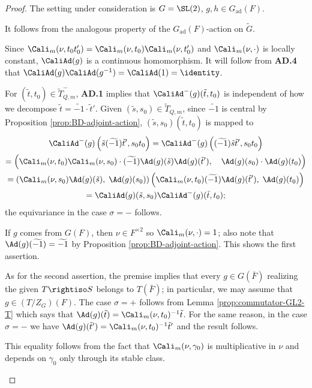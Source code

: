 \documentclass[a4paper,10pt]{article}
\begin{document}
\begin{proof}
	The setting under consideration is $G=\SL(2)$, $g,h \in G_\text{ad}(F)$.
	\begin{asparaenum}[\bfseries{AD}.1.\;]
	\item It follows from the analogous property of the $G_\text{ad}(F)$-action on $\tilde{G}$.
 
	\item Since $\Cali_m(\nu, t_0 t'_0) = \Cali_m(\nu, t_0) \Cali_m(\nu, t'_0)$ and $\Cali_m(\nu, \cdot)$ is locally constant, $\CaliAd(g)$ is a continuous homomorphism. It will follow from \textbf{AD.4} that $\CaliAd(g) \CaliAd(g^{-1}) = \CaliAd(1) = \identity$.
	
	For $(\tilde{t}, t_0) \in \tilde{T}^-_{Q,m}$, \textbf{AD.1} implies that $\CaliAd^-(g)(\tilde{t}, t_0)$ is independent of how we decompose $\tilde{t} = \widetilde{-1} \cdot \tilde{t}'$. Given $(\tilde{s}, s_0) \in \tilde{T}_{Q,m}$, since $\widetilde{-1}$ is central by Proposition \ref{prop:BD-adjoint-action}, $(\tilde{s}, s_0)(\tilde{t}, t_0)$ is mapped to
	\begin{multline*}
		\CaliAd^-(g)\left( \tilde{s} (\widetilde{-1}) \tilde{t}', s_0 t_0 \right) = \CaliAd^-(g)\left( (\widetilde{-1}) \tilde{s}\tilde{t}', s_0 t_0  \right) \\
		= \left( \Cali_m(\nu, t_0) \Cali_m(\nu, s_0) \cdot (\widetilde{-1}) \Ad(g)(\tilde{s}) \Ad(g)(\tilde{t}'), \quad \Ad(g)(s_0) \cdot \Ad(g)(t_0) \right) \\
		= \left( \Cali_m(\nu, s_0) \Ad(g)(\tilde{s}), \; \Ad(g)(s_0)\right) \left( \Cali_m(\nu, t_0) (\widetilde{-1}) \Ad(g)(\tilde{t}'), \; \Ad(g)(t_0) \right) \\
		= \CaliAd(g)(\tilde{s}, s_0) \CaliAd^-(g)(\tilde{t}, t_0);
	\end{multline*}
	the equivariance in the case $\sigma = -$ follows.

	\item If $g$ comes from $G(F)$, then $\nu \in F^{\times 2}$ so $\Cali_m(\nu, \cdot) = 1$; also note that $\Ad(g)(\widetilde{-1}) = \widetilde{-1}$ by Proposition \ref{prop:BD-adjoint-action}. This shows the first assertion.
	
	As for the second assertion, the premise implies that every $g \in G(\bar{F})$ realizing the given $T \rightiso S$ belongs to $T(\bar{F})$; in particular, we may assume that $g \in (T/Z_G)(F)$. The case $\sigma=+$ follows from Lemma \ref{prop:commutator-GL2-T} which says that $\Ad(g)(\tilde{t}) = \Cali_m(\nu, t_0)^{-1} \tilde{t}$. For the same reason, in the case $\sigma=-$ we have $\Ad(g)(\tilde{t}') = \Cali_m(\nu, t_0)^{-1} \tilde{t}'$ and the result follows.

	\item This equality follows from the fact that $\Cali_m(\nu, \gamma_0)$ is multiplicative in $\nu$ and depends on $\gamma_0$ only through its stable class.
	\end{asparaenum}
\end{proof}
\end{document}
